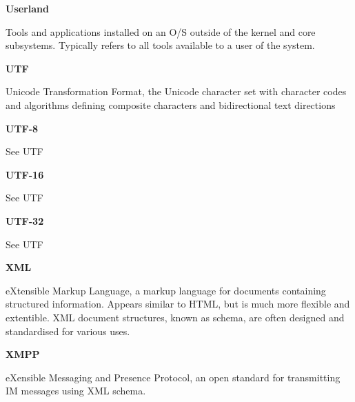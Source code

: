 \textbf{Userland}

Tools and applications installed on an O/S outside of the kernel and
core subsystems. Typically refers to all tools available to a user of
the system.

\textbf{UTF}

Unicode Transformation Format, the Unicode character set with character 
codes and algorithms defining composite characters and bidirectional
text directions

\textbf{UTF-8}

See UTF

\textbf{UTF-16}

See UTF

\textbf{UTF-32}

See UTF

\textbf{XML}

eXtensible Markup Language, a markup language for documents containing
structured information. Appears similar to HTML, but is much more
flexible and extentible. XML document structures, known as schema, are
often designed and standardised for various uses.

\textbf{XMPP}

eXensible Messaging and Presence Protocol, an open standard for
transmitting IM messages using XML schema.
